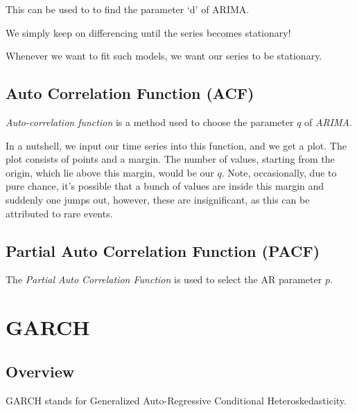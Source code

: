 This can be used to to find the parameter ‘d’ of ARIMA.

We simply keep on differencing until the series becomes stationary!

Whenever we want to fit such models, we want our series to be stationary.

\subsection{Auto Correlation Function (ACF)}

\emph{Auto-correlation function} is a method used to choose the parameter $q$ of \emph{ARIMA}.

In a nutshell, we input our time series into this function, and we get a plot. The plot consists of points and a margin. The number of values, starting from the origin, which lie above this margin, would be our $q$. Note, occasionally, due to pure chance, it’s possible that a bunch of values are inside this margin and suddenly one jumps out, however, these are insignificant, as this can be attributed to rare events.

\subsection{Partial Auto Correlation Function (PACF)}

The \emph{Partial Auto Correlation Function} is used to select the AR parameter $p$.



\section{GARCH}

\subsection{Overview}

GARCH stands for Generalized Auto-Regressive Conditional Heteroskedasticity.


